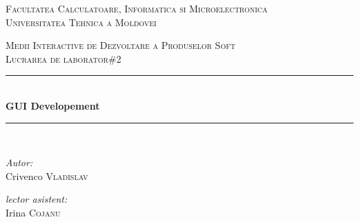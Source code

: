 \documentclass[a4paper, 12pt]{article}
\begin{document}
\begin{titlepage}

	\begin{center}
	\textsc{\large Facultatea Calculatoare, Informatica si Microelectronica}\\[0.5cm]
	\textsc{\large Universitatea Tehnica a Moldovei}\\[1.2cm]
	\vspace{25mm}

	\textsc{\Large Medii Interactive de Dezvoltare a Produselor Soft}\\[0.5cm]
  	\textsc{\large Lucrarea de laborator\#2}\\[0.5cm] 

	\newcommand{\HRule}{\rule{\linewidth}{0.5mm}} 
	\vspace{10 mm}

  	\HRule \\[0.4cm]

 	 { \LARGE \bfseries GUI Developement  }\\[0.4cm] 

  	\HRule \\[1.5cm]

	\vspace{30mm}

	\begin{minipage}{0.4\textwidth}
	\begin{flushleft} \large
	\emph{Autor:} \\
	Crivenco \textsc{Vladislav}\\
	\end{flushleft}
	\end{minipage}
      	\begin{minipage}{0.4\textwidth}

      	\begin{flushright} \large

      	\emph{lector asistent:} \\

      	Irina \textsc{Cojanu} \\ %

     	 \end{flushright}

      	\end{minipage}\\[4cm]



     	\vspace{5 mm}

	\vfill

	\end{center}

\end{titlepage}
\end{document}
